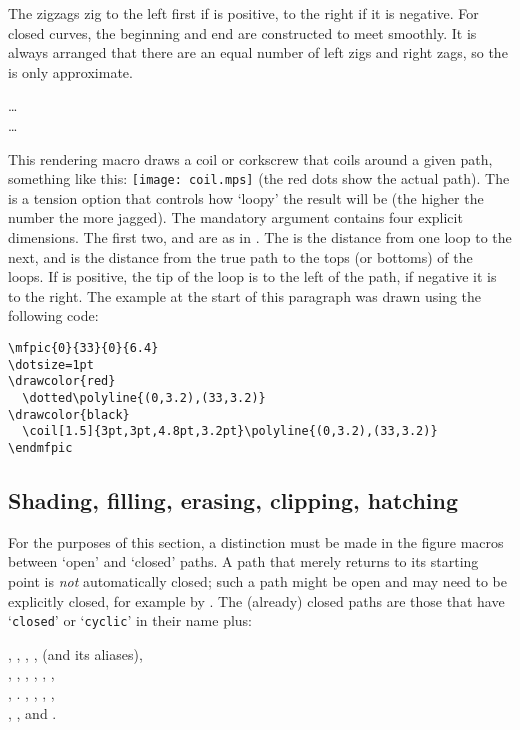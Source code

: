 \documentclass[letterpaper]{article}
\begin{document}
The zigzags zig to the left first if  is positive, to the
right if it is negative. For closed curves, the beginning and end are
constructed to meet smoothly. It is always arranged that there are an
equal number of left zigs and right zags, so the  is only
approximate.


\begin{cd}
%
    \dots\\%
%
    \dots%
%
\end{cd}

This rendering macro draws a coil or corkscrew that coils around a
given path, something like this: \texttt{[image: coil.mps]} (the red
dots show the actual path). The  is a tension option that
controls how `loopy' the result will be (the higher the number the more
jagged). The mandatory argument contains four explicit dimensions. The
first two,  and  are as in . The
 is the distance from one loop to the next, and  is
the distance from the true path to the tops (or bottoms) of the
loops. If  is positive, the tip of the loop is to the left
of the path, if negative it is to the right. The example at the start of
this paragraph was drawn using the following code:
\begin{verbatim}
\mfpic{0}{33}{0}{6.4}
\dotsize=1pt
\drawcolor{red}
  \dotted\polyline{(0,3.2),(33,3.2)}
\drawcolor{black}
  \coil[1.5]{3pt,3pt,4.8pt,3.2pt}\polyline{(0,3.2),(33,3.2)}
\endmfpic
\end{verbatim}


\subsection{Shading, filling, erasing, clipping, hatching}\label{filling}

For the purposes of this section, a distinction must be made in the
figure macros between `open' and `closed' paths. A path that merely
returns to its starting point is \emph{not} automatically closed; such a
path might be open and may need to be explicitly closed, for example by
. The (already) closed paths are those that have
`\texttt{closed}' or `\texttt{cyclic}' in their name plus:
\begin{display}
  , , , ,
     (and its aliases),\\
  , , , ,
    , ,\\
  , . , ,
    , ,\\
  , , and .
\end{display}
\end{document}
